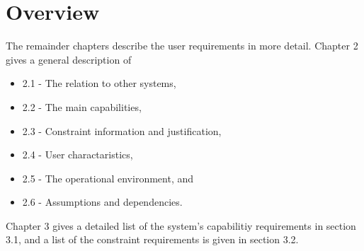 



\section{Overview}

The remainder chapters describe the user requirements in more detail. Chapter 2 gives a general description of 
\begin{itemize}
\item 2.1 - The relation to other systems,
\item 2.2 - The main capabilities,
\item 2.3 - Constraint information and justification,
\item 2.4 - User charactaristics,
\item 2.5 - The operational environment, and
\item 2.6 - Assumptions and dependencies.
\end{itemize}

Chapter 3 gives a detailed list of the system's capabilitiy requirements in section 3.1, and a list of the constraint requirements is given in section 3.2.


